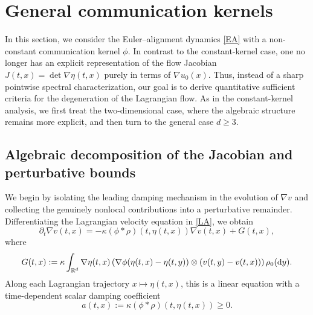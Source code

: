 \documentclass[11pt]{amsart}
\numberwithin{equation}{section}
\theoremstyle{definition}
\theoremstyle{remark}
\numberwithin{equation}{section}
\newcommand{\R}{\mathbb R}
\newcommand{\lt}{\left}
\newcommand{\rt}{\right}
\newcommand{\pa}{\partial}
\newcommand{\intr}{\int_{\R^d}}
\newcommand{\dy}{\textnormal{d}y}
\renewcommand{\ge}{\geqslant}
\begin{document}
 
%
%
%                       
%
%
 

\section{General communication kernels}\label{sec:non_const}

In this section, we consider the Euler--alignment dynamics \eqref{EA} with a non-constant communication kernel $\phi$. In contrast to the constant-kernel case, one no longer has an explicit representation of the flow Jacobian $J(t,x)=\det\nabla\eta(t,x)$ purely in terms of $\nabla u_0(x)$. Thus, instead of a sharp pointwise spectral characterization, our goal is to derive quantitative sufficient criteria for the degeneration of the Lagrangian flow.  As in the constant-kernel analysis, we first treat the two-dimensional case, where the algebraic structure remains more explicit, and then turn to the general case $d\ge3$.




%
%
%                       
%
%
 

\subsection{Algebraic decomposition of the Jacobian and perturbative bounds}

We begin by isolating the leading damping mechanism in the evolution of $\nabla v$ and collecting the genuinely nonlocal contributions into a perturbative remainder. Differentiating the Lagrangian velocity equation in \eqref{LA}, we obtain
\[
\pa_t \nabla v(t,x) = - \kappa (\phi * \rho)(t,\eta(t,x)) \nabla v(t,x) + G(t,x),
\]
where
\[
G(t,x) := \kappa \intr \nabla\eta(t,x) \lt(\nabla\phi(\eta(t,x)-\eta(t,y))\otimes (v(t,y)-v(t,x))\rt)\rho_0(\dy).
\]
 Along each Lagrangian trajectory
$x\mapsto \eta(t,x)$, this is a linear equation with a time-dependent scalar
damping coefficient
\[
a(t,x):=\kappa(\phi * \rho)(t,\eta(t,x))\ge0.
\]
\end{document}
